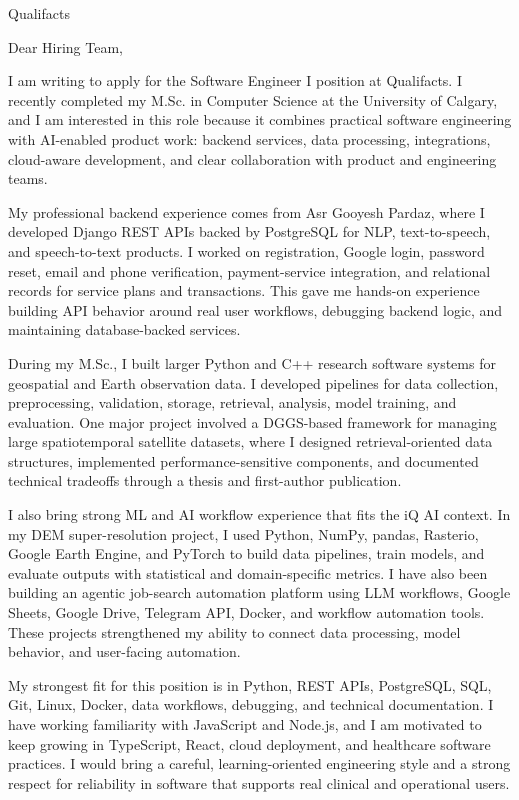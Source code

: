 \documentclass[11pt]{letter}
\begin{document}
\begin{letter}{Qualifacts}

\opening{Dear Hiring Team,}

I am writing to apply for the Software Engineer I position at Qualifacts. I recently completed my M.Sc. in Computer Science at the University of Calgary, and I am interested in this role because it combines practical software engineering with AI-enabled product work: backend services, data processing, integrations, cloud-aware development, and clear collaboration with product and engineering teams.

My professional backend experience comes from Asr Gooyesh Pardaz, where I developed Django REST APIs backed by PostgreSQL for NLP, text-to-speech, and speech-to-text products. I worked on registration, Google login, password reset, email and phone verification, payment-service integration, and relational records for service plans and transactions. This gave me hands-on experience building API behavior around real user workflows, debugging backend logic, and maintaining database-backed services.

During my M.Sc., I built larger Python and C++ research software systems for geospatial and Earth observation data. I developed pipelines for data collection, preprocessing, validation, storage, retrieval, analysis, model training, and evaluation. One major project involved a DGGS-based framework for managing large spatiotemporal satellite datasets, where I designed retrieval-oriented data structures, implemented performance-sensitive components, and documented technical tradeoffs through a thesis and first-author publication.

I also bring strong ML and AI workflow experience that fits the iQ AI context. In my DEM super-resolution project, I used Python, NumPy, pandas, Rasterio, Google Earth Engine, and PyTorch to build data pipelines, train models, and evaluate outputs with statistical and domain-specific metrics. I have also been building an agentic job-search automation platform using LLM workflows, Google Sheets, Google Drive, Telegram API, Docker, and workflow automation tools. These projects strengthened my ability to connect data processing, model behavior, and user-facing automation.

My strongest fit for this position is in Python, REST APIs, PostgreSQL, SQL, Git, Linux, Docker, data workflows, debugging, and technical documentation. I have working familiarity with JavaScript and Node.js, and I am motivated to keep growing in TypeScript, React, cloud deployment, and healthcare software practices. I would bring a careful, learning-oriented engineering style and a strong respect for reliability in software that supports real clinical and operational users.


\end{letter}
\end{document}
